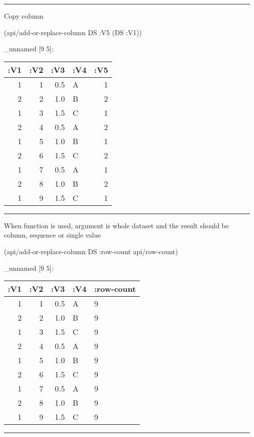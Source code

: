 \documentclass[]{article}
\newenvironment{Shaded}{\begin{snugshade}}{\end{snugshade}}
\newcommand{\AttributeTok}[1]{\textcolor[rgb]{0.77,0.63,0.00}{#1}}
\newcommand{\NormalTok}[1]{#1}
\begin{document}
\begin{center}\rule{0.5\linewidth}{0.5pt}\end{center}

Copy column

\begin{Shaded}
\begin{Highlighting}[]
\NormalTok{(api/add-or-replace-column DS }\AttributeTok{:V5}\NormalTok{ (DS }\AttributeTok{:V1}\NormalTok{))}
\end{Highlighting}
\end{Shaded}

\_unnamed {[}9 5{]}:

\begin{longtable}[]{@{}rrrlr@{}}
\toprule
:V1 & :V2 & :V3 & :V4 & :V5\tabularnewline
\midrule
\endhead
1 & 1 & 0.5 & A & 1\tabularnewline
2 & 2 & 1.0 & B & 2\tabularnewline
1 & 3 & 1.5 & C & 1\tabularnewline
2 & 4 & 0.5 & A & 2\tabularnewline
1 & 5 & 1.0 & B & 1\tabularnewline
2 & 6 & 1.5 & C & 2\tabularnewline
1 & 7 & 0.5 & A & 1\tabularnewline
2 & 8 & 1.0 & B & 2\tabularnewline
1 & 9 & 1.5 & C & 1\tabularnewline
\bottomrule
\end{longtable}

\begin{center}\rule{0.5\linewidth}{0.5pt}\end{center}

When function is used, argument is whole dataset and the result should
be column, sequence or single value

\begin{Shaded}
\begin{Highlighting}[]
\NormalTok{(api/add-or-replace-column DS }\AttributeTok{:row-count}\NormalTok{ api/row-count) }
\end{Highlighting}
\end{Shaded}

\_unnamed {[}9 5{]}:

\begin{longtable}[]{@{}rrrll@{}}
\toprule
:V1 & :V2 & :V3 & :V4 & :row-count\tabularnewline
\midrule
\endhead
1 & 1 & 0.5 & A & 9\tabularnewline
2 & 2 & 1.0 & B & 9\tabularnewline
1 & 3 & 1.5 & C & 9\tabularnewline
2 & 4 & 0.5 & A & 9\tabularnewline
1 & 5 & 1.0 & B & 9\tabularnewline
2 & 6 & 1.5 & C & 9\tabularnewline
1 & 7 & 0.5 & A & 9\tabularnewline
2 & 8 & 1.0 & B & 9\tabularnewline
1 & 9 & 1.5 & C & 9\tabularnewline
\bottomrule
\end{longtable}

\begin{center}\rule{0.5\linewidth}{0.5pt}\end{center}
\end{document}
